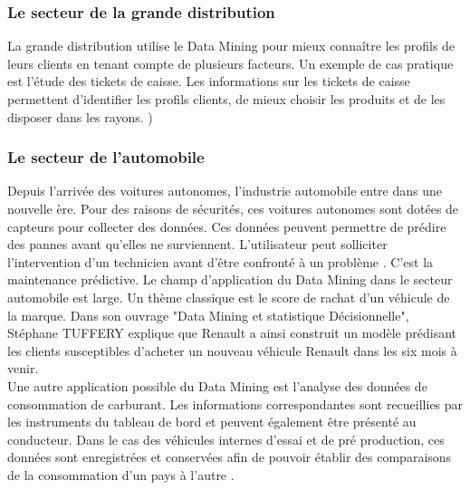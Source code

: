 \documentclass[11pt,a4paper]{report}
\begin{document}
  
%
%
 
   
%
%

 \subsubsection{Le secteur de la grande distribution}
 
 La grande distribution utilise le Data Mining  pour mieux connaître les profils de leurs clients en tenant compte de plusieurs facteurs. Un exemple de cas pratique est l'étude des tickets de caisse. Les informations sur les tickets de caisse permettent d'identifier les profils clients, de mieux choisir les produits et de les disposer dans les rayons. \cite{stephane})
 
 \subsubsection{Le secteur de l'automobile}
Depuis l’arrivée des voitures autonomes, l'industrie automobile entre dans une nouvelle ère. Pour des raisons de sécurités, ces voitures autonomes sont dotées de capteurs pour collecter des données. Ces données peuvent permettre de prédire des pannes avant qu’elles ne surviennent. L’utilisateur peut solliciter l’intervention d’un technicien avant d’être confronté à un problème \cite{auto_mining}. C’est la maintenance prédictive. 
Le champ d'application du Data Mining dans le secteur automobile est large. Un thème classique est le score de rachat d'un véhicule de la marque. Dans son ouvrage "Data Mining et statistique Décisionnelle", Stéphane TUFFERY explique que Renault a ainsi construit un modèle prédisant les clients susceptibles d'acheter un nouveau véhicule Renault dans les six mois à venir\cite{stephane}. \\
Une autre application possible du Data Mining est l’analyse des données de consommation de carburant. Les informations correspondantes sont recueillies par les instruments du tableau de bord et peuvent également être présenté au conducteur. Dans le cas des véhicules internes d’essai et de pré production, ces données sont enregistrées et conservées afin de pouvoir établir des comparaisons de la consommation d’un pays à l’autre \cite{bmw}.
\end{document}

